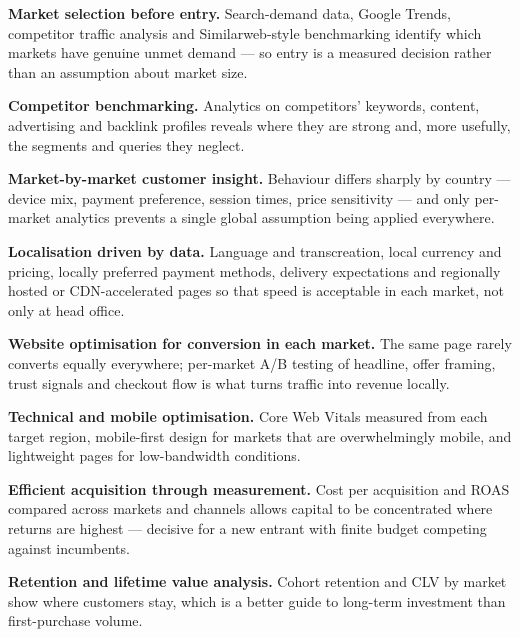 \begin{qlist}
\begin{apts}
\item \textbf{Market selection before entry.} Search-demand data, Google Trends,
      competitor traffic analysis and Similarweb-style benchmarking identify
      which markets have genuine unmet demand --- so entry is a measured
      decision rather than an assumption about market size.
\item \textbf{Competitor benchmarking.} Analytics on competitors' keywords,
      content, advertising and backlink profiles reveals where they are strong
      and, more usefully, the segments and queries they neglect.
\item \textbf{Market-by-market customer insight.} Behaviour differs sharply by
      country --- device mix, payment preference, session times, price
      sensitivity --- and only per-market analytics prevents a single global
      assumption being applied everywhere.
\item \textbf{Localisation driven by data.} Language and transcreation, local
      currency and pricing, locally preferred payment methods, delivery
      expectations and regionally hosted or CDN-accelerated pages so that speed
      is acceptable in each market, not only at head office.
\item \textbf{Website optimisation for conversion in each market.} The same
      page rarely converts equally everywhere; per-market A/B testing of
      headline, offer framing, trust signals and checkout flow is what turns
      traffic into revenue locally.
\item \textbf{Technical and mobile optimisation.} Core Web Vitals measured from
      each target region, mobile-first design for markets that are
      overwhelmingly mobile, and lightweight pages for low-bandwidth
      conditions.
\item \textbf{Efficient acquisition through measurement.} Cost per acquisition
      and ROAS compared across markets and channels allows capital to be
      concentrated where returns are highest --- decisive for a new entrant with
      finite budget competing against incumbents.
\item \textbf{Retention and lifetime value analysis.} Cohort retention and CLV
      by market show where customers stay, which is a better guide to long-term
      investment than first-purchase volume.

\end{apts}
\end{qlist}
